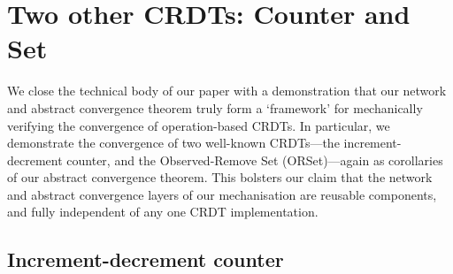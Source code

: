 \section{Two other CRDTs: Counter and Set}
\label{sect.simple.crdts}

We close the technical body of our paper with a demonstration that our network and abstract convergence theorem truly form a `framework' for mechanically verifying the convergence of operation-based CRDTs.
In particular, we demonstrate the convergence of two well-known CRDTs---the increment-decrement counter, and the Observed-Remove Set (ORSet)---again as corollaries of our abstract convergence theorem.
This bolsters our claim that the network and abstract convergence layers of our mechanisation are reusable components, and fully independent of any one CRDT implementation.

\subsection{Increment-decrement counter}
\label{subsect.increment-decrement.counter}

